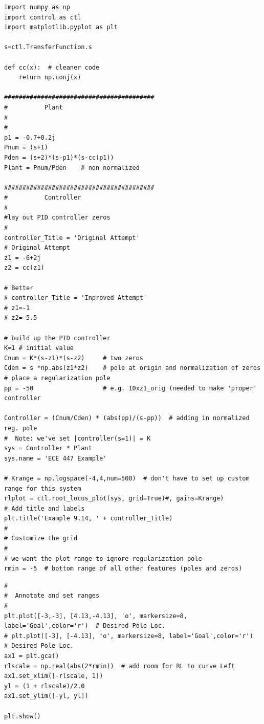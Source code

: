 %
%
%


\begin{listing}
    \begin{verbatim}
import numpy as np
import control as ctl
import matplotlib.pyplot as plt

s=ctl.TransferFunction.s

def cc(x):  # cleaner code
    return np.conj(x)

#########################################
#          Plant
#
#
p1 = -0.7+0.2j
Pnum = (s+1)
Pden = (s+2)*(s-p1)*(s-cc(p1))
Plant = Pnum/Pden    # non normalized

#########################################
#          Controller
#
#lay out PID controller zeros
#
controller_Title = 'Original Attempt'
# Original Attempt
z1 = -6+2j
z2 = cc(z1)

# Better
# controller_Title = 'Inproved Attempt'
# z1=-1
# z2=-5.5

# build up the PID controller
K=1 # initial value
Cnum = K*(s-z1)*(s-z2)     # two zeros
Cden = s *np.abs(z1*z2)    # pole at origin and normalization of zeros
# place a regularization pole
pp = -50                   # e.g. 10xz1_orig (needed to make 'proper' controller

Controller = (Cnum/Cden) * (abs(pp)/(s-pp))  # adding in normalized reg. pole
#  Note: we've set |controller(s=1)| = K
sys = Controller * Plant
sys.name = 'ECE 447 Example'

# Krange = np.logspace(-4,4,num=500)  # don't have to set up custom range for this system
rlplot = ctl.root_locus_plot(sys, grid=True)#, gains=Krange)
# Add title and labels
plt.title('Example 9.14, ' + controller_Title)
#
# Customize the grid
#
# we want the plot range to ignore regularization pole
rmin = -5  # bottom range of all other features (poles and zeros)
  \end{verbatim}
  \caption{Root Locus plotting for Example 9.14.(Part 1)}
  \label{ex14Listinga}
\end{listing}



\begin{listing}
\begin{verbatim}
#
#  Annotate and set ranges
#
plt.plot([-3,-3], [4.13,-4.13], 'o', markersize=8, label='Goal',color='r')  # Desired Pole Loc.
# plt.plot([-3], [-4.13], 'o', markersize=8, label='Goal',color='r')  # Desired Pole Loc.
ax1 = plt.gca()
rlscale = np.real(abs(2*rmin))  # add room for RL to curve Left
ax1.set_xlim([-rlscale, 1])
yl = (1 + rlscale)/2.0
ax1.set_ylim([-yl, yl])

plt.show()
  \end{verbatim}
  \caption{Root Locus plotting for Example 9.14 (Part 2). Design goal for pole locations shown by red dots.}
  \label{ex14Listingb}
\end{listing}




